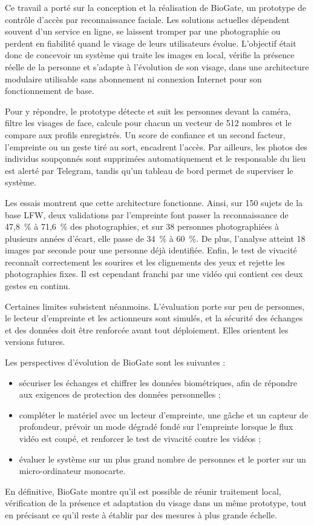 \conclusion
{}
\begin{maj}
Ce travail a porté sur la conception et la réalisation de BioGate, un prototype de contrôle d'accès par reconnaissance faciale. Les solutions actuelles dépendent souvent d'un service en ligne, se laissent tromper par une photographie ou perdent en fiabilité quand le visage de leurs utilisateurs évolue. L'objectif était donc de concevoir un système qui traite les images en local, vérifie la présence réelle de la personne et s'adapte à l'évolution de son visage, dans une architecture modulaire utilisable sans abonnement ni connexion Internet pour son fonctionnement de base.

Pour y répondre, le prototype détecte et suit les personnes devant la caméra, filtre les visages de face, calcule pour chacun un vecteur de 512 nombres et le compare aux profils enregistrés. Un score de confiance et un second facteur, l'empreinte ou un geste tiré au sort, encadrent l'accès. Par ailleurs, les photos des individus soupçonnés sont supprimées automatiquement et le responsable du lieu est alerté par Telegram, tandis qu'un tableau de bord permet de superviser le système.

Les essais montrent que cette architecture fonctionne. Ainsi, sur 150 sujets de la base LFW, deux validations par l'empreinte font passer la reconnaissance de 47,8~\% à 71,6~\% des photographies, et sur 38 personnes photographiées à plusieurs années d'écart, elle passe de 34~\% à 60~\%. De plus, l'analyse atteint 18 images par seconde pour une personne déjà identifiée. Enfin, le test de vivacité reconnaît correctement les sourires et les clignements des yeux et rejette les photographies fixes. Il est cependant franchi par une vidéo qui contient ces deux gestes en continu.

Certaines limites subsistent néanmoins. L'évaluation porte sur peu de personnes, le lecteur d'empreinte et les actionneurs sont simulés, et la sécurité des échanges et des données doit être renforcée avant tout déploiement. Elles orientent les versions futures.

Les perspectives d'évolution de BioGate sont les suivantes :
\begin{itemize}
  \item sécuriser les échanges et chiffrer les données biométriques, afin de répondre aux exigences de protection des données personnelles ;
  \item compléter le matériel avec un lecteur d'empreinte, une gâche et un capteur de profondeur, prévoir un mode dégradé fondé sur l'empreinte lorsque le flux vidéo est coupé, et renforcer le test de vivacité contre les vidéos ;
  \item évaluer le système sur un plus grand nombre de personnes et le porter sur un micro-ordinateur monocarte.
\end{itemize}

En définitive, BioGate montre qu'il est possible de réunir traitement local, vérification de la présence et adaptation du visage dans un même prototype, tout en précisant ce qu'il reste à établir par des mesures à plus grande échelle.
\end{maj}
